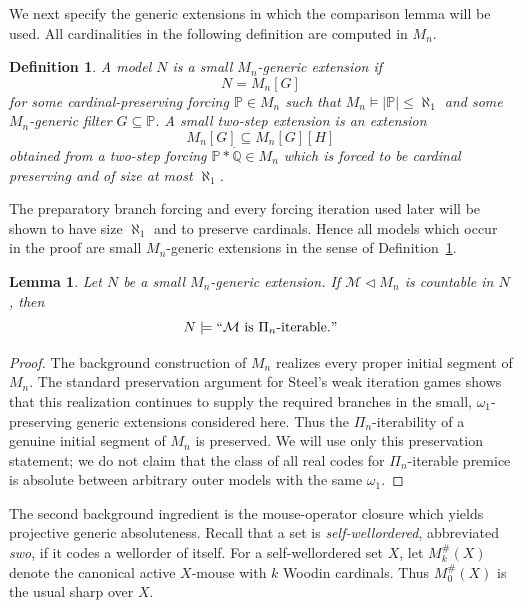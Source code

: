 \documentclass[a4paper,11pt]{article}
\newtheorem{lemma}[theorem]{Lemma}
\newtheorem{definition}[theorem]{Definition}
\newcommand{\forceP}{\mathbb{P}}
\newcommand{\forceQ}{\mathbb{Q}}
\begin{document}
We next specify the generic extensions in which the comparison lemma will be
used.  All cardinalities in the following definition are computed in $M_n$.

\begin{definition}
\label{definition-small-Mn-generic-extension}
A model $N$ is a \emph{small $M_n$-generic extension} if
\[
   N=M_n[G]
\]
for some cardinal-preserving forcing $\forceP\in M_n$ such that
$M_n\models|\forceP|\leq\aleph_1$ and some $M_n$-generic filter
$G\subseteq\forceP$.  A \emph{small two-step extension} is an extension
\[
   M_n[G]\subseteq M_n[G][H]
\]
obtained from a two-step forcing
$\forceP*\dot{\forceQ}\in M_n$ which is forced to be cardinal preserving and
of size at most $\aleph_1$.
\end{definition}

The preparatory branch forcing and every forcing iteration used later will be
shown to have size $\aleph_1$ and to preserve cardinals.  Hence all models
which occur in the proof are small $M_n$-generic extensions in the sense of
Definition~\ref{definition-small-Mn-generic-extension}.

\begin{lemma}
\label{lemma-preservation-Steel-Pin-iterability}
Let $N$ be a small $M_n$-generic extension.  If
$\mathcal M\triangleleft M_n$ is countable in $N$, then
\[
   N\models ``\mathcal M\text{ is }\Pi_n\text{-iterable}."
\]
\end{lemma}

\begin{proof}
The background construction of $M_n$ realizes every proper initial segment of
$M_n$.  The standard preservation argument for Steel's weak iteration games
shows that this realization continues to supply the required branches in the
small, $\omega_1$-preserving generic extensions considered here.  Thus the
$\Pi_n$-iterability of a genuine initial segment of $M_n$ is preserved.  We
will use only this preservation statement; we do not claim that the class of
all real codes for $\Pi_n$-iterable premice is absolute between arbitrary
outer models with the same $\omega_1$.
\end{proof}

The second background ingredient is the mouse-operator closure which yields
projective generic absoluteness.  Recall that a set is
\emph{self-wellordered}, abbreviated \emph{swo}, if it codes a wellorder of
itself.  For a self-wellordered set $X$, let $M_k^{\#}(X)$ denote the canonical
active $X$-mouse with $k$ Woodin cardinals.  Thus $M_0^{\#}(X)$ is the usual
sharp over $X$.
\end{document}
